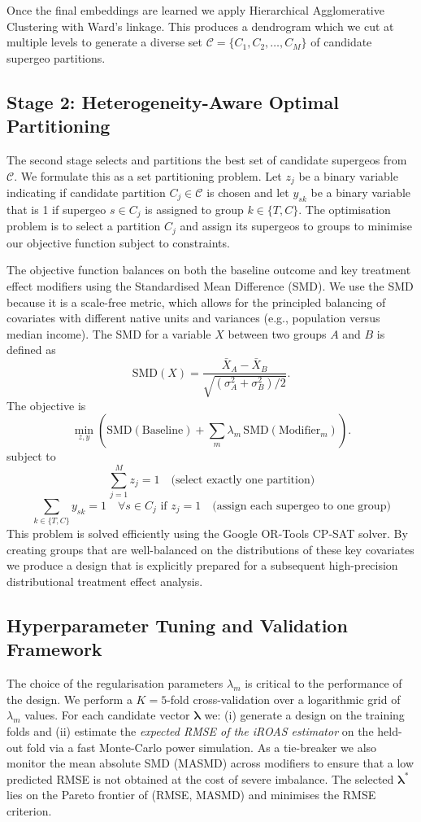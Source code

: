 \documentclass[final,3p,fleqn, 10pt]{elsarticle}
\begin{document}
    Once the final embeddings are learned we apply Hierarchical Agglomerative Clustering with Ward's linkage. This produces a dendrogram which we cut at multiple levels to generate a diverse set $\mathcal{C} = \{C_1, C_2, \dots, C_M\}$ of candidate supergeo partitions.

    \subsection{Stage 2: Heterogeneity-Aware Optimal Partitioning}
    The second stage selects and partitions the best set of candidate supergeos from $\mathcal{C}$. We formulate this as a set partitioning problem. Let $z_j$ be a binary variable indicating if candidate partition $C_j \in \mathcal{C}$ is chosen and let $y_{sk}$ be a binary variable that is 1 if supergeo $s \in C_j$ is assigned to group $k \in \{T, C\}$. The optimisation problem is to select a partition $C_j$ and assign its supergeos to groups to minimise our objective function subject to constraints.

    The objective function balances on both the baseline outcome and key treatment effect modifiers using the Standardised Mean Difference (SMD). We use the SMD because it is a scale-free metric, which allows for the principled balancing of covariates with different native units and variances (e.g., population versus median income). The SMD for a variable $X$ between two groups $A$ and $B$ is defined as \[
    \text{SMD}(X) = \frac{\bar{X}_A - \bar{X}_B}{\sqrt{(\sigma_A^{2} + \sigma_B^{2})/2}}.
\] The objective is
    \[
\min_{z, y} \left( \text{SMD}(\text{Baseline}) + \sum_{m} \lambda_m\, \text{SMD}(\text{Modifier}_m) \right).
\]
    subject to
    $$ \sum_{j=1}^{M} z_j = 1 \quad \text{(select exactly one partition)} $$
    $$ \sum_{k \in \{T,C\}} y_{sk} = 1 \quad \forall s \in C_j \text{ if } z_j=1 \quad \text{(assign each supergeo to one group)} $$
    This problem is solved efficiently using the Google OR-Tools CP-SAT solver. By creating groups that are well-balanced on the distributions of these key covariates we produce a design that is explicitly prepared for a subsequent high-precision distributional treatment effect analysis.

    \subsection{Hyperparameter Tuning and Validation Framework}
    The choice of the regularisation parameters $\lambda_m$ is critical to the performance of the design. We perform a $K{=}5$-fold cross-validation over a logarithmic grid of $\lambda_m$ values. For each candidate vector $\boldsymbol{\lambda}$ we: (i) generate a design on the training folds and (ii) estimate the \emph{expected RMSE of the iROAS estimator} on the held-out fold via a fast Monte-Carlo power simulation. As a tie-breaker we also monitor the mean absolute SMD (MASMD) across modifiers to ensure that a low predicted RMSE is not obtained at the cost of severe imbalance. The selected $\boldsymbol{\lambda}^*$ lies on the Pareto frontier of (RMSE, MASMD) and minimises the RMSE criterion.
    
\end{document}
